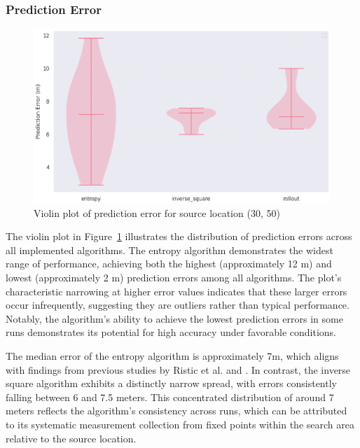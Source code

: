 \documentclass[../report.tex]{subfiles}
\begin{document}
    \subsubsection{Prediction Error}
    \begin{figure}[ht]
        \centering
        \includegraphics[width=\linewidth]{figures/prediction_violin_plot.png}
        \caption{Violin plot of prediction error for source location (30, 50)}
        \label{fig:prediction_violin_plot}
    \end{figure}

    The violin plot in Figure~\ref{fig:prediction_violin_plot} illustrates the distribution of prediction errors across all implemented algorithms. The entropy algorithm demonstrates the widest 
    range of performance, achieving both the highest (approximately 12 m) and lowest (approximately 2 m) prediction errors among all algorithms. The plot's characteristic narrowing at higher 
    error values indicates that these larger errors occur infrequently, suggesting they are outliers rather than typical performance. Notably, the algorithm's ability to achieve the lowest 
    prediction errors in some runs demonstrates its potential for high accuracy under favorable conditions.

    The median error of the entropy algorithm is approximately 7m, which aligns with findings from previous studies by Ristic et al. \cite{Ristic2007AnIG} and \cite{ristic2010information}. In 
    contrast, the inverse square algorithm exhibits a distinctly narrow spread, with errors consistently falling between 6 and 7.5 meters. This concentrated distribution of around 7 meters reflects 
    the algorithm's consistency across runs, which can be attributed to its systematic measurement collection from fixed points within the search area relative to the source location.
\end{document}
